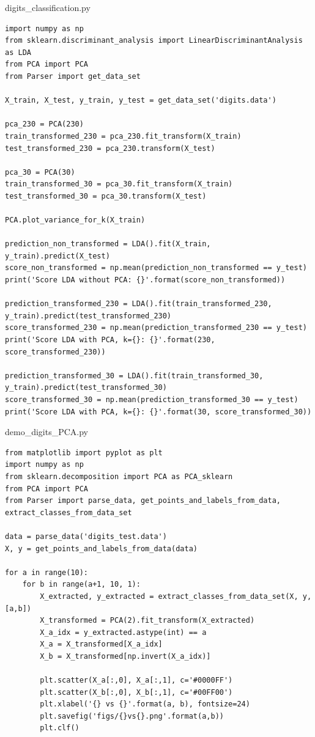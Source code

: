 digits\_classification.py
\begin{lstlisting}[style=py]
import numpy as np
from sklearn.discriminant_analysis import LinearDiscriminantAnalysis as LDA
from PCA import PCA
from Parser import get_data_set

X_train, X_test, y_train, y_test = get_data_set('digits.data')

pca_230 = PCA(230)
train_transformed_230 = pca_230.fit_transform(X_train)
test_transformed_230 = pca_230.transform(X_test)

pca_30 = PCA(30)
train_transformed_30 = pca_30.fit_transform(X_train)
test_transformed_30 = pca_30.transform(X_test)

PCA.plot_variance_for_k(X_train)

prediction_non_transformed = LDA().fit(X_train, y_train).predict(X_test)
score_non_transformed = np.mean(prediction_non_transformed == y_test)
print('Score LDA without PCA: {}'.format(score_non_transformed))

prediction_transformed_230 = LDA().fit(train_transformed_230, y_train).predict(test_transformed_230)
score_transformed_230 = np.mean(prediction_transformed_230 == y_test)
print('Score LDA with PCA, k={}: {}'.format(230, score_transformed_230))

prediction_transformed_30 = LDA().fit(train_transformed_30, y_train).predict(test_transformed_30)
score_transformed_30 = np.mean(prediction_transformed_30 == y_test)
print('Score LDA with PCA, k={}: {}'.format(30, score_transformed_30))

\end{lstlisting}

demo\_digits\_PCA.py
\begin{lstlisting}[style=py]
from matplotlib import pyplot as plt
import numpy as np
from sklearn.decomposition import PCA as PCA_sklearn
from PCA import PCA
from Parser import parse_data, get_points_and_labels_from_data, extract_classes_from_data_set

data = parse_data('digits_test.data')
X, y = get_points_and_labels_from_data(data)

for a in range(10):
    for b in range(a+1, 10, 1):
        X_extracted, y_extracted = extract_classes_from_data_set(X, y, [a,b])
        X_transformed = PCA(2).fit_transform(X_extracted)
        X_a_idx = y_extracted.astype(int) == a
        X_a = X_transformed[X_a_idx]
        X_b = X_transformed[np.invert(X_a_idx)]

        plt.scatter(X_a[:,0], X_a[:,1], c='#0000FF')
        plt.scatter(X_b[:,0], X_b[:,1], c='#00FF00')
        plt.xlabel('{} vs {}'.format(a, b), fontsize=24)
        plt.savefig('figs/{}vs{}.png'.format(a,b))
        plt.clf()

\end{lstlisting}

